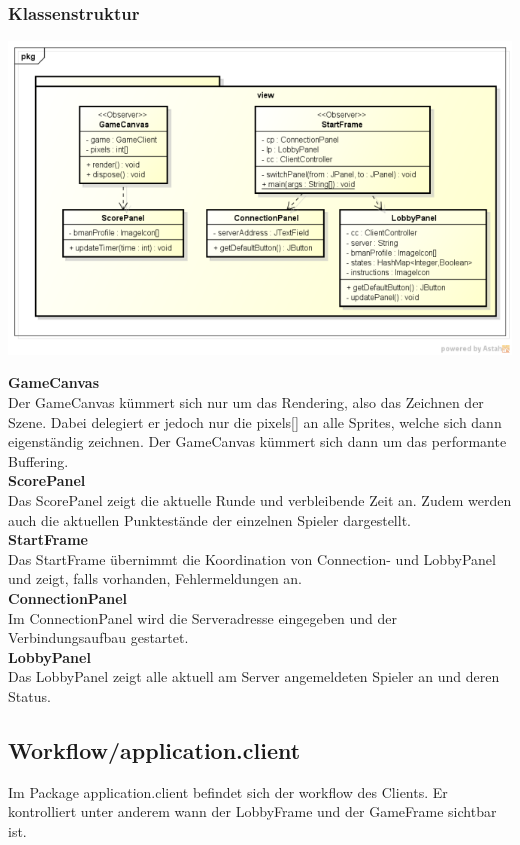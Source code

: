 \documentclass[11pt]{scrartcl}
\begin{document}
\subsubsection{Klassenstruktur}
\includegraphics[scale=0.8]{ClassDiagramView}

\textbf{GameCanvas}\\
Der GameCanvas kümmert sich nur um das Rendering, also das Zeichnen der Szene. Dabei delegiert er jedoch nur die pixels[] an alle Sprites, welche sich dann eigenständig zeichnen. Der GameCanvas kümmert sich dann um das performante Buffering.\\

\textbf{ScorePanel}\\
Das ScorePanel zeigt die aktuelle Runde und verbleibende Zeit an. Zudem werden auch die aktuellen Punktestände der einzelnen Spieler dargestellt.\\

\textbf{StartFrame}\\
Das StartFrame übernimmt die Koordination von Connection- und LobbyPanel und zeigt, falls vorhanden, Fehlermeldungen an.\\

\textbf{ConnectionPanel}\\
Im ConnectionPanel wird die Serveradresse eingegeben und der Verbindungsaufbau gestartet.\\

\textbf{LobbyPanel}\\
Das LobbyPanel zeigt alle aktuell am Server angemeldeten Spieler an und deren Status.


\newpage

\subsection{Workflow/application.client}
Im Package application.client befindet sich der workflow des Clients. Er kontrolliert unter anderem wann der LobbyFrame und der GameFrame sichtbar ist.
\end{document}

